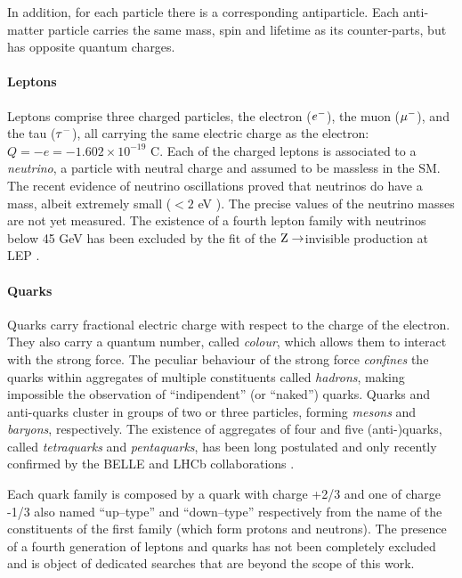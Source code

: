In addition, for each particle there is a corresponding antiparticle. Each anti-matter particle carries the same mass, spin and lifetime as its counter-parts, but has opposite quantum charges.

\paragraph{Leptons} 

Leptons comprise three charged particles, the electron ($e\-$), the muon ($\mu\-$), and the tau ($\tau\-$), all carrying the same electric charge as the electron: $Q = -e = -1.602 \times 10^{-19}$ C. Each of the charged leptons is associated to a \emph{neutrino}, a particle with neutral charge and assumed to be massless in the SM. The recent evidence of neutrino oscillations \cite{Agafonova:2010dc} proved that neutrinos do have a mass, albeit extremely small ($< 2$ eV \cite{pdg}). The precise values of the neutrino masses are not yet measured. The existence of a fourth lepton family with neutrinos below 45 GeV has been excluded by the fit of the $\Z\To$invisible production at LEP \cite{ALEPH:2005ab}. 

\paragraph{Quarks}

Quarks carry fractional electric charge with respect to the charge of the electron. They also carry a quantum number, called \emph{colour}, which allows them to interact with the strong force. The peculiar behaviour of the strong force \emph{confines} the quarks within aggregates of multiple constituents called \emph{hadrons}, making impossible the observation of ``indipendent'' (or ``naked'') quarks. Quarks and anti-quarks cluster in groups of two or three particles, forming \emph{mesons} and \emph{baryons}, respectively. The existence of aggregates of four and five (anti-)quarks, called \emph{tetraquarks} and \emph{pentaquarks}, has been long postulated and only recently confirmed by the BELLE \cite{Choi:2007wga} and LHCb collaborations \cite{Aaij:2014jqa}.

Each quark family is composed by a quark with charge +2/3 and one of charge -1/3 also named ``up--type'' and ``down--type'' respectively from the name of the constituents of the first family (which form protons and neutrons). The presence of a fourth generation of leptons and quarks has not been completely excluded and is object of dedicated searches that are beyond the scope of this work.

